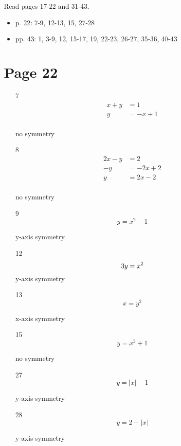 \documentclass[fleqn,addpoints]{exam}
\begin{document}
Read pages 17-22 and 31-43.
 
\begin{itemize}
  \item p. 22: 7-9, 12-13, 15, 27-28
  \item pp. 43: 1, 3-9, 12, 15-17, 19, 22-23, 26-27, 35-36, 40-43
\end{itemize}

\ifprintanswers
\section{Page 22}
\begin{itemize}

\item[7]
\begin{align*}
  x + y &= 1 \\
  y &= -x + 1 \\
\end{align*}

no symmetry

\item[8]
\begin{align*}
  2x - y &= 2 \\
  -y &= -2x + 2 \\
  y &= 2x - 2 \\
\end{align*}

no symmetry
\item[9]
\[
  y = x^2 - 1 
\]

y-axis symmetry

\item[12]
\[
  3y = x^2 \\
\]
y-axis symmetry

\item[13]
\[
  x = y^2
\]

x-axis symmetry

\item[15]
\[
  y = x^3 + 1 
\]

no symmetry





\item[27]
\[
  y = |x| - 1
\]

y-axis symmetry

\item[28]
\[
  y = 2 - |x|
\]

y-axis symmetry

\end{itemize}
\end{document}
